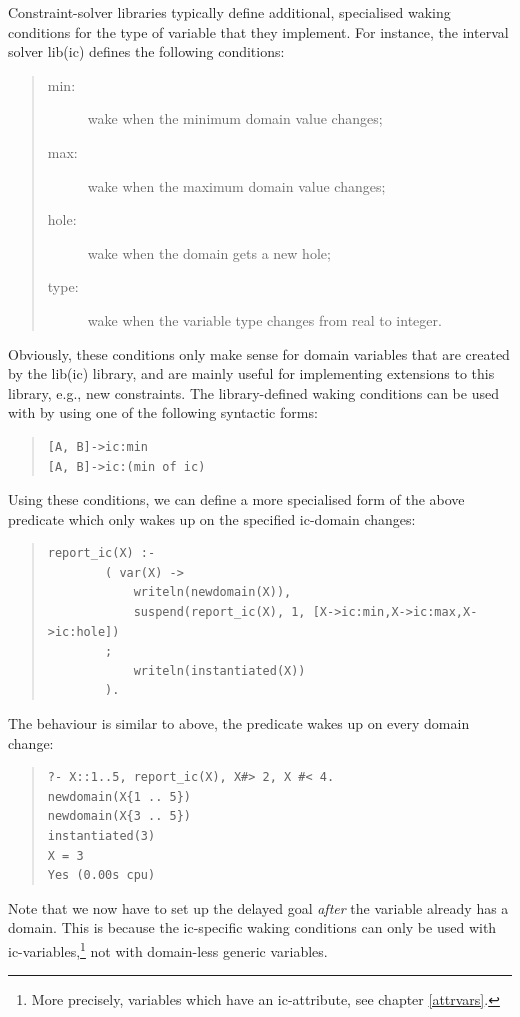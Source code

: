 Constraint-solver libraries typically define additional, specialised
waking conditions for the type of variable that they implement.
For instance, the interval solver lib(ic) defines the following
conditions:
\begin{quote}
\begin{description}
\item[min:] wake when the minimum domain value changes;
\item[max:] wake when the maximum domain value changes;
\item[hole:] wake when the domain gets a new hole;
\item[type:] wake when the variable type changes from real to integer.
\end{description}
\end{quote}
Obviously, these conditions only make sense for domain variables
that are created by the lib(ic) library, and are mainly useful for
implementing extensions to this library, e.g., new constraints.
The library-defined waking conditions can be used with
by using one of the following syntactic forms:
\begin{quote}
\begin{verbatim}
[A, B]->ic:min
[A, B]->ic:(min of ic)
\end{verbatim}
\end{quote}
Using these conditions, we can define a more specialised form of
the above  predicate which only wakes up on the specified
ic-domain changes:
\begin{quote}
\begin{verbatim}
report_ic(X) :-
        ( var(X) ->
            writeln(newdomain(X)),
            suspend(report_ic(X), 1, [X->ic:min,X->ic:max,X->ic:hole])
        ;
            writeln(instantiated(X))
        ).
\end{verbatim}
\end{quote}
The behaviour is similar to above, the predicate wakes up on every
domain change:
\begin{quote}
\begin{verbatim}
?- X::1..5, report_ic(X), X#> 2, X #< 4.
newdomain(X{1 .. 5})
newdomain(X{3 .. 5})
instantiated(3)
X = 3
Yes (0.00s cpu)
\end{verbatim}
\end{quote}
Note that we now have to set up the delayed goal \emph{after} the
variable already has a domain. This is because the ic-specific waking
conditions can only be used with ic-variables,\footnote{%
  More precisely,
  variables which have an ic-attribute, see chapter \ref{attrvars}.}
not with domain-less generic variables.



